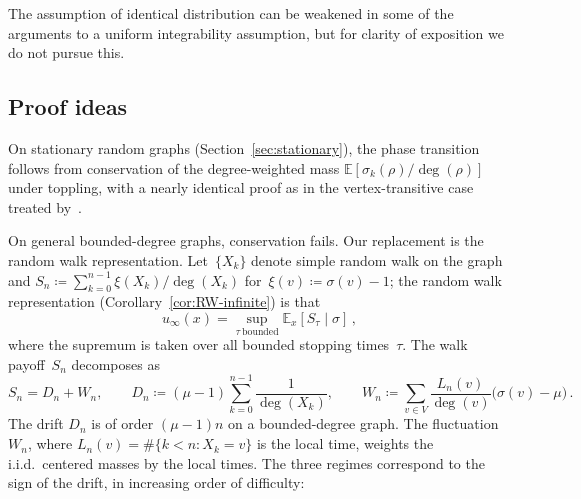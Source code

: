\documentclass[11pt]{amsart}
\theoremstyle{plain}
\theoremstyle{definition}
\newcommand{\E}{\mathbb{E}}
\begin{document}
	The assumption of identical distribution can be weakened in some of the arguments to a uniform integrability assumption, but for clarity of exposition we do not pursue this.
	
	
	\subsection{Proof ideas}
	On stationary random graphs (Section~\ref{sec:stationary}), the phase transition follows from conservation of the degree-weighted mass $\E[\sigma_k(\rho)/\deg(\rho)]$ under toppling, with a nearly identical proof as in the vertex-transitive case treated by~\citet{div-sand-crit}.
	
	On general bounded-degree graphs, conservation fails. Our replacement is the random walk representation. Let~$\{X_k\}$ denote simple random walk on the graph and $S_n\coloneqq\sum_{k=0}^{n-1}\xi(X_k)/\deg(X_k)$ for~$\xi(v)\coloneqq\sigma(v)-1$; the random walk representation (Corollary~\ref{cor:RW-infinite}) is that
	\[
	u_\infty(x)=\sup_{\tau\ \mathrm{bounded}}\E_x[S_\tau\mid\sigma]\, , 
	\]
	where the supremum is taken over all bounded stopping times~$\tau$. The walk payoff~$S_n$ decomposes as
	\begin{equation}
		S_n = D_n + W_n,\qquad
		D_n \coloneqq (\mu - 1)\sum_{k=0}^{n-1} \frac{1}{\deg(X_k)},\qquad
		W_n \coloneqq \sum_{v\in V}\frac{L_n(v)}{\deg(v)}\bigl(\sigma(v)-\mu\bigr)\,.
		\label{eq:dn-wn-stuff}
	\end{equation}
	The drift $D_n$ is of order $(\mu-1)n$ on a bounded-degree graph. The fluctuation $W_n$, where $L_n(v)=\#\{k<n:X_k=v\}$ is the local time, weights the i.i.d.\ centered masses by the local times. The three regimes correspond to the sign of the drift, in increasing order of difficulty:
\end{document}
